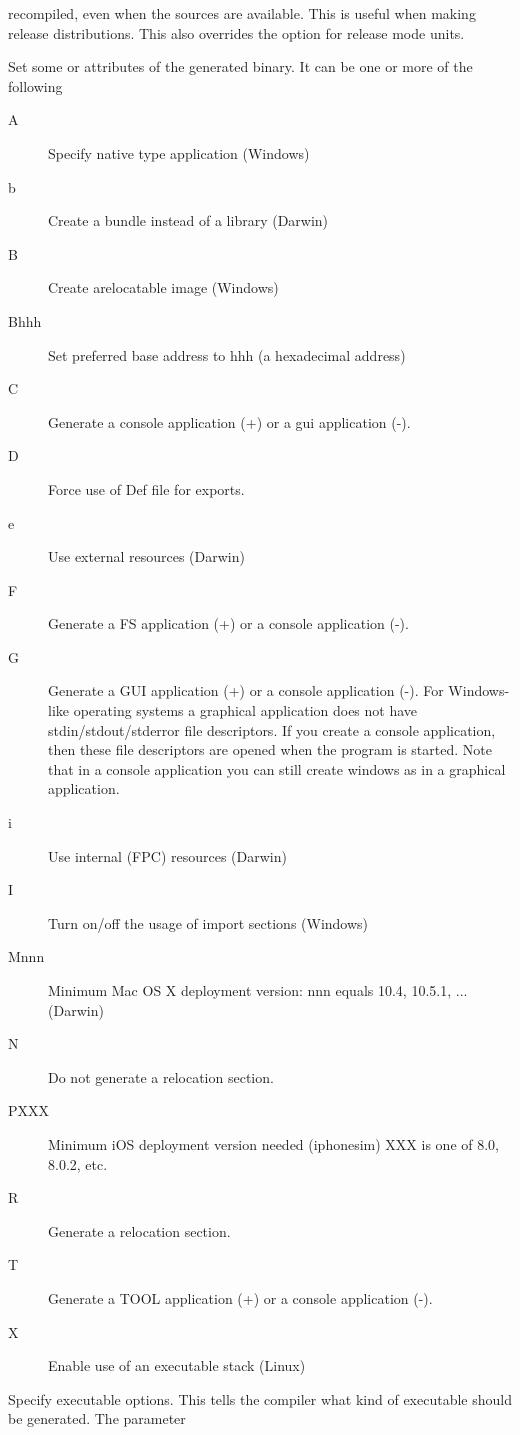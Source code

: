 \begin{description}
recompiled, even when the sources are available. This is useful when making
release distributions. This also overrides the  option for release
mode units.
\item[-W] Set some \windows or \ostwo attributes of the generated binary. It
can be one or more of the following
\begin{description}
\item[A] Specify native type application (Windows)
\item[b] Create a bundle instead of a library (Darwin)
\item[B] Create arelocatable image (Windows)
\item[Bhhh] Set preferred base address to hhh (a hexadecimal address)
\item[C] Generate a console application (+) or a gui application (-).
\item[D] Force use of Def file for exports.
\item[e] Use external resources (Darwin)
\item[F] Generate a FS application (+) or a console application (-).
\item[G] Generate a GUI application (+) or a console application (-). For
Windows-like operating systems a graphical application does not have
stdin/stdout/stderror file descriptors. If you create a console application, 
then these file descriptors are opened when the program is started. Note that
in a console application you can still create windows as in a graphical application.
\item[i] Use internal (FPC) resources (Darwin)
\item[I] Turn on/off the usage of import sections (Windows)
\item[Mnnn] Minimum Mac OS X deployment version: nnn equals 10.4, 10.5.1, ... (Darwin)
\item[N] Do not generate a relocation section.
\item[PXXX] Minimum iOS deployment version needed (iphonesim) XXX is one of 8.0, 8.0.2, etc.
\item[R] Generate a relocation section.
\item[T] Generate a TOOL application (+) or a console application (-).
\item[X] Enable use of an executable stack (Linux)
\end{description}
\item [-Xx]  Specify executable options. This tells the compiler what
kind of executable should be generated. The parameter 

\end{description}
